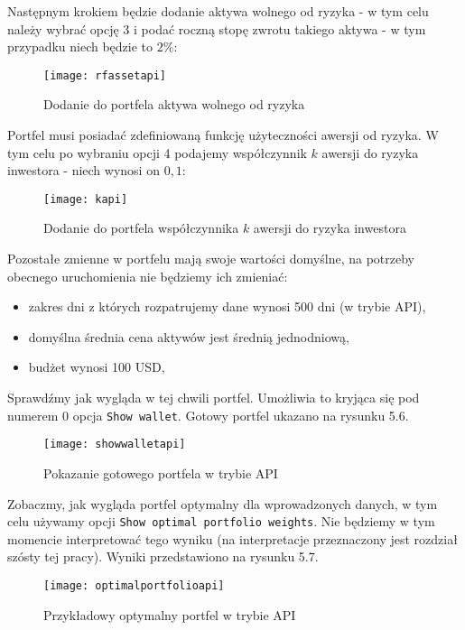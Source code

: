\documentclass[magister]{dyplom}
\def\code#1{\texttt{#1}}
\begin{document}
Następnym krokiem będzie dodanie aktywa wolnego od ryzyka - w tym celu należy wybrać opcję 3 i podać roczną stopę zwrotu takiego aktywa - w tym przypadku niech będzie to $2\%$:
\newpage
\begin{figure}[ht]
	\centering
	\texttt{[image: rfassetapi]}
	\caption{Dodanie do portfela aktywa wolnego od ryzyka}
\end{figure}

Portfel musi posiadać zdefiniowaną funkcję użyteczności awersji od ryzyka. W tym celu po wybraniu opcji 4 podajemy współczynnik $k$ awersji do ryzyka inwestora - niech wynosi on $0,1$:

\begin{figure}[ht]
	\centering
	\texttt{[image: kapi]}
	\caption{Dodanie do portfela współczynnika $k$ awersji do ryzyka inwestora}
\end{figure}

Pozostałe zmienne w portfelu mają swoje wartości domyślne, na potrzeby obecnego uruchomienia nie będziemy ich zmieniać:

\begin{itemize}
	\item zakres dni z których rozpatrujemy dane wynosi 500 dni (w trybie API),
	\item domyślna średnia cena aktywów jest średnią jednodniową,
	\item budżet wynosi 100 USD,
\end{itemize}

Sprawdźmy jak wygląda w tej chwili portfel. Umożliwia to kryjąca się pod numerem $0$ opcja \code{Show wallet}. Gotowy portfel ukazano na rysunku 5.6.

\begin{figure}[ht]
	\centering
	\texttt{[image: showwalletapi]}
	\caption{Pokazanie gotowego portfela w trybie API}
\end{figure}

Zobaczmy, jak wygląda portfel optymalny dla wprowadzonych danych, w tym celu używamy opcji \code{Show optimal portfolio weights}. Nie będziemy w tym momencie interpretować tego wyniku (na interpretacje przeznaczony jest rozdział szósty tej pracy). Wyniki przedstawiono na rysunku 5.7.

\begin{figure}[ht]
	\centering
	\texttt{[image: optimalportfolioapi]}
	\caption{Przykładowy optymalny portfel w trybie API}
\end{figure}
\newpage
\end{document}
